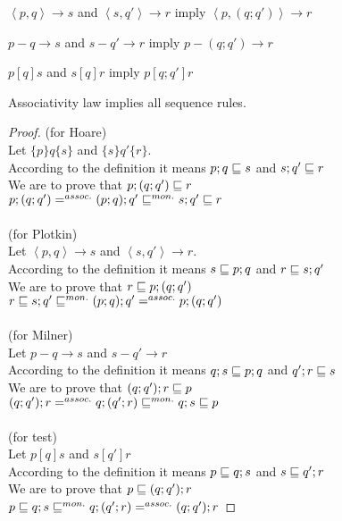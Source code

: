 \documentclass{article}
\begin{document}
\begin{rul}
$\left\langle p, q \right\rangle \rightarrow s$ and $\left\langle s, q' \right\rangle \rightarrow r$ imply $\left\langle p, (q; q') \right\rangle \rightarrow r$
\end{rul}

\begin{rul}
$p - q \rightarrow s$ and $s - q' \rightarrow r$ imply $p - (q; q') \rightarrow r$
\end{rul}

\begin{rul}
$p [q] s$ and $s [q] r$ imply $p [q; q'] r$
\end{rul}

\begin{theorem}
Associativity law implies all sequence rules.
\end{theorem}

\begin{proof}
(for Hoare)\\
Let $\{p\}q\{s\}$ and $\{s\}q'\{r\}$.\\
According to the definition it means $p; q \sqsubseteq s$ and $s; q' \sqsubseteq r$\\
We are to prove that $p; (q; q') \sqsubseteq r$\\
$p; (q; q') =^{assoc.} (p; q); q' \sqsubseteq^{mon.} s; q' \sqsubseteq r$\\
\\
(for Plotkin)\\
Let $\left\langle p, q \right\rangle \rightarrow s$ and $\left\langle s, q' \right\rangle \rightarrow r$.\\
According to the definition it means $s \sqsubseteq p; q$ and $r \sqsubseteq s; q'$\\
We are to prove that $r \sqsubseteq p; (q; q')$\\
$r \sqsubseteq s; q' \sqsubseteq^{mon.} (p; q); q' =^{assoc.} p; (q; q')$\\
\\
(for Milner)\\
Let $p - q \rightarrow s$ and $s - q' \rightarrow r$\\
According to the definition it means $q; s \sqsubseteq p; q$ and $q'; r \sqsubseteq s$\\
We are to prove that $(q; q'); r \sqsubseteq p$\\
$(q; q'); r =^{assoc.} q; (q'; r) \sqsubseteq^{mon.} q; s \sqsubseteq p$\\
\\
(for test)\\
Let $p [q] s$ and $s [q'] r$\\
According to the definition it means $p \sqsubseteq q; s$ and $s \sqsubseteq q'; r$\\
We are to prove that $p \sqsubseteq (q; q'); r$\\
$p \sqsubseteq q; s \sqsubseteq^{mon.} q; (q'; r) =^{assoc.} (q; q'); r$
\end{proof}
\end{document}
